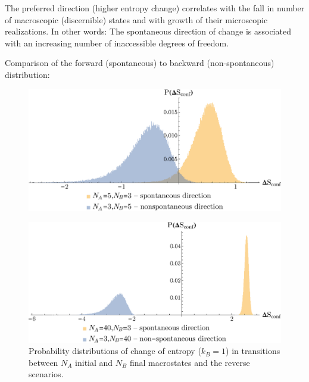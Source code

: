 \documentclass[a0]{sciposter}
\begin{document}
\begin{multicols}{3}
\begin{flushleft}
\vspace{0.6cm} 
\begin{tcolorbox}[colframe=green!500!white,colback=white!50!white,boxrule=3pt]
The preferred direction (higher entropy change) correlates with the fall in number of macroscopic (discernible) states and with growth of their microscopic realizations. In other words: The spontaneous direction of change is associated with an increasing number of inaccessible degrees of freedom.
\end{tcolorbox}


Comparison of the forward (spontaneous) to backward (non-spontaneous) distribution:

\begin{minipage}[b]{22.0cm}
\centering
\begin{figure}[ht!]
\includegraphics[width=22cm]{Figure3.eps} 
\end{figure}
\end{minipage}
\begin{minipage}[b]{22.0cm}
\centering
\begin{figure}[ht!]
\includegraphics[width=22cm]{Figure4.eps} \caption{Probability distributions of change of entropy ($k_B =1$) in transitions between $N_A$ initial and $N_B$ final macrostates and the reverse scenarios.}
\label{Fig4} 
\end{figure}
\end{minipage}
\vspace{0.3cm} 


\end{flushleft}
\end{multicols}
\end{document}
